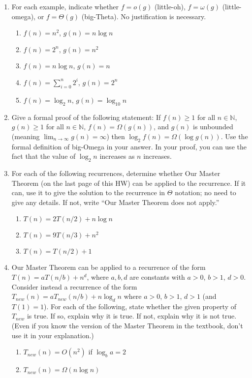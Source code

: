 \documentclass{article}
\begin{document}
\begin{enumerate}
    \item For each example, indicate whether $f = o(g)$ (little-oh), $f = \omega(g)$ (little-omega), or $f = \Theta(g)$ (big-Theta). No justification is necessary.
    \begin{enumerate}
        \item $f(n) = n^2$, $g(n) = n \log n$
        \item $f(n) = 2^n$, $g(n) = n^2$
        \item $f(n) = n \log n$, $g(n) = n$
        \item $f(n) = \sum_{i=0}^{n} 2^i$, $g(n) = 2^n$
        \item $f(n) = \log_2 n$, $g(n) = \log_{10} n$
    \end{enumerate}

    \item Give a formal proof of the following statement: If $f(n) \geq 1$ for all $n \in \mathbb{N}$, $g(n) \geq 1$ for all $n \in \mathbb{N}$, $f(n) = \Omega(g(n))$, and $g(n)$ is unbounded (meaning $\lim_{n \to \infty} g(n) = \infty$) then $\log_2 f(n) = \Omega(\log g(n))$. Use the formal definition of big-Omega in your answer. In your proof, you can use the fact that the value of $\log_2 n$ increases as $n$ increases.

    \item For each of the following recurrences, determine whether Our Master Theorem (on the last page of this HW) can be applied to the recurrence. If it can, use it to give the solution to the recurrence in $\Theta$ notation; no need to give any details. If not, write “Our Master Theorem does not apply.”
    \begin{enumerate}
        \item $T(n) = 2T(n/2) + n \log n$
        \item $T(n) = 9T(n/3) + n^2$
        \item $T(n) = T(n/2) + 1$
    \end{enumerate}

    \item Our Master Theorem can be applied to a recurrence of the form $T(n) = aT(n/b) + n^d$, where $a, b, d$ are constants with $a > 0$, $b > 1$, $d > 0$. Consider instead a recurrence of the form $T_{new}(n) = aT_{new}(n/b) + n \log_d n$ where $a > 0$, $b > 1$, $d > 1$ (and $T(1) = 1$). For each of the following, state whether the given property of $T_{new}$ is true. If so, explain why it is true. If not, explain why it is not true. (Even if you know the version of the Master Theorem in the textbook, don’t use it in your explanation.)
    \begin{enumerate}
        \item $T_{new}(n) = O(n^2)$ if $\log_b a = 2$
        \item $T_{new}(n) = \Omega(n \log n)$
    \end{enumerate}


\end{enumerate}
\end{document}
